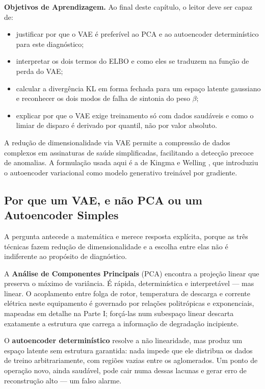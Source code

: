 \documentclass[12pt,a4paper]{article}
\numberwithin{equation}{section}
\numberwithin{table}{section}
\numberwithin{figure}{section}
\begin{document}
	\textbf{Objetivos de Aprendizagem.} Ao final deste capítulo, o leitor
	deve ser capaz de:
	\begin{itemize}
		\item justificar por que o VAE é preferível ao PCA e ao
		autoencoder determinístico para este diagnóstico;
		\item interpretar os dois termos do ELBO e como eles se traduzem
		na função de perda do VAE;
		\item calcular a divergência KL em forma fechada para um espaço
		latente gaussiano e reconhecer os dois modos de falha de sintonia
		do peso $\beta$;
		\item explicar por que o VAE exige treinamento só com dados
		saudáveis e como o limiar de disparo é derivado por quantil, não
		por valor absoluto.
	\end{itemize}

	A redução de dimensionalidade via VAE permite a compressão de dados complexos em assinaturas de saúde simplificadas, facilitando a detecção precoce de anomalias. A formulação usada aqui é a de Kingma e Welling \cite{vae}, que introduziu o autoencoder variacional como modelo generativo treinável por gradiente.

	\subsection{Por que um VAE, e não PCA ou um Autoencoder Simples}

	A pergunta antecede a matemática e merece resposta explícita, porque as três técnicas fazem redução de dimensionalidade e a escolha entre elas não é indiferente ao propósito de diagnóstico.

	A \textbf{Análise de Componentes Principais} (PCA) encontra a projeção linear que preserva o máximo de variância. É rápida, determinística e interpretável — mas linear. O acoplamento entre folga de rotor, temperatura de descarga e corrente elétrica neste equipamento é governado por relações politrópicas e exponenciais, mapeadas em detalhe na Parte I; forçá-las num subespaço linear descarta exatamente a estrutura que carrega a informação de degradação incipiente.

	O \textbf{autoencoder determinístico} resolve a não linearidade, mas produz um espaço latente sem estrutura garantida: nada impede que ele distribua os dados de treino arbitrariamente, com regiões vazias entre os aglomerados. Um ponto de operação novo, ainda saudável, pode cair numa dessas lacunas e gerar erro de reconstrução alto — um falso alarme.
\end{document}
